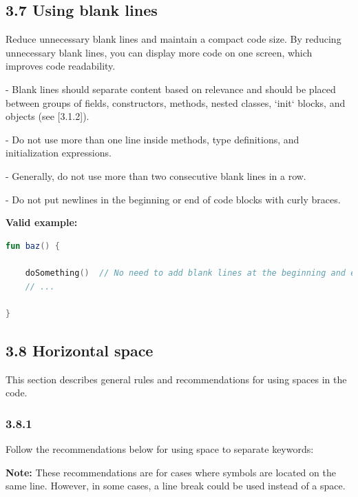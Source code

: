 {{\subsection*{\textbf{3.7 Using blank lines}}



Reduce unnecessary blank lines and maintain a compact code size. By reducing unnecessary blank lines, you can display more code on one screen, which improves code readability.

- Blank lines should separate content based on relevance and should be placed between groups of fields, constructors, methods, nested classes, `init` blocks, and objects (see [3.1.2]).

- Do not use more than one line inside methods, type definitions, and initialization expressions.

- Generally, do not use more than two consecutive blank lines in a row.

- Do not put newlines in the beginning or end of code blocks with curly braces.



\textbf{Valid example:}

\begin{lstlisting}[language=Kotlin]
fun baz() {
        
    doSomething()  // No need to add blank lines at the beginning and end of the code block
    // ...

}
\end{lstlisting}


\subsection*{\textbf{3.8 Horizontal space}}

This section describes general rules and recommendations for using spaces in the code.

\subsubsection*{\textbf{3.8.1}}
\leavevmode\newline



Follow the recommendations below for using space to separate keywords:



\textbf{Note:} These recommendations are for cases where symbols are located on the same line. However, in some cases, a line break could be used instead of a space.



}}

